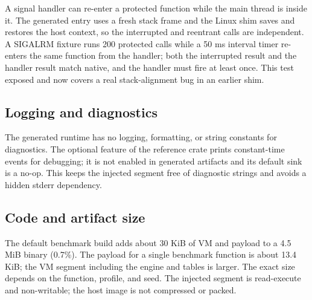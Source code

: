 A signal handler can re-enter a protected function while the main thread is
inside it. The generated entry uses a fresh stack frame and the Linux shim saves
and restores the host context, so the interrupted and reentrant calls are
independent. A SIGALRM fixture runs 200 protected calls while a 50 ms interval
timer re-enters the same function from the handler; both the interrupted result
and the handler result match native, and the handler must fire at least once.
This test exposed and now covers a real stack-alignment bug in an earlier shim.

\subsection{Logging and diagnostics}

The generated runtime has no logging, formatting, or string constants for
diagnostics. The optional  feature of the  reference
crate prints constant-time events for debugging; it is not enabled in generated
artifacts and its default sink is a no-op. This keeps the injected segment free
of diagnostic strings and avoids a hidden stderr dependency.

\subsection{Code and artifact size}

The default benchmark build adds about 30 KiB of VM and payload to a 4.5 MiB
binary (0.7\%). The payload for a single benchmark function is about 13.4 KiB;
the VM segment including the engine and tables is larger. The exact size depends
on the function, profile, and seed. The injected segment is read-execute and
non-writable; the host image is not compressed or packed.
